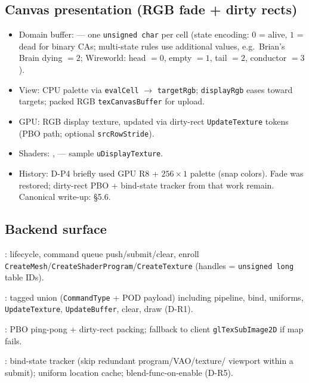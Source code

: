 \subsection{Canvas presentation (RGB fade + dirty rects)}
\label{sec:canvas-rgb-fade}
\begin{itemize}
  \item Domain buffer:  --- one \texttt{unsigned char}
        per cell (state encoding: $0$ = alive, $1$ = dead for binary CAs;
        multi-state rules use additional values, e.g.\ Brian's Brain dying $=2$;
        Wireworld: head $=0$, empty $=1$, tail $=2$, conductor $=3$).
  \item View: CPU palette via \texttt{evalCell} $\rightarrow$ \texttt{targetRgb};
        \texttt{displayRgb} eases toward targets; packed RGB
        \texttt{texCanvasBuffer} for upload.
  \item GPU: RGB display texture, updated via dirty-rect \texttt{UpdateTexture}
        tokens (PBO path; optional \texttt{srcRowStride}).
  \item Shaders: ,
         --- sample \texttt{uDisplayTexture}.
  \item History: D-P4 briefly used GPU R8 + $256\times 1$ palette (snap colors).
        Fade was restored; dirty-rect PBO + bind-state tracker from that work
        remain. Canonical write-up:
         \S5.6.
\end{itemize}

\subsection{Backend surface}
: lifecycle, command queue push/submit/clear, enroll
\texttt{CreateMesh}/\texttt{CreateShaderProgram}/\texttt{CreateTexture}
(handles = \texttt{unsigned long} table IDs).

: tagged union (\texttt{CommandType} + POD payload)
including pipeline, bind, uniforms, \texttt{UpdateTexture}, \texttt{UpdateBuffer},
clear, draw (D-R1).

: PBO ping-pong + dirty-rect packing;
fallback to client \texttt{glTexSubImage2D} if map fails.

: bind-state tracker (skip redundant program/VAO/texture/
viewport within a submit); uniform location cache; blend-func-on-enable (D-R5).

